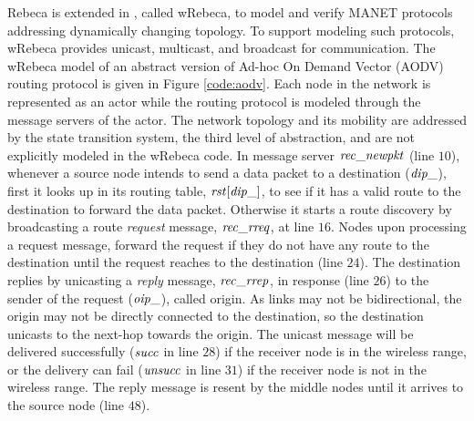 Rebeca is extended in \cite{FOAC}, called wRebeca, to model and verify %
MANET protocols addressing dynamically changing topology. To support modeling such protocols, wRebeca provides unicast, multicast, and broadcast for communication. The wRebeca model of an abstract version of Ad-hoc On Demand Vector (AODV) routing protocol \cite{AODV} is given in Figure \ref{code:aodv}. Each node in the network is represented as an actor while the routing protocol
is modeled through the message servers of the actor. The network topology and its mobility are addressed by the state transition system, the third level of abstraction, and are not explicitly modeled in the wRebeca code.  
%
In message server ${\it rec\_newpkt}$ (line $10$),
whenever a source node intends to send a data packet to a destination (${\it dip\_}$), %
first it looks up in its routing table, ${\it rst}[{\it dip\_}]$, to see if it has a valid route to the destination to forward the data packet. Otherwise it starts a route discovery by broadcasting a route \emph{request} message, ${\it rec\_rreq}$, at line $16$. 
%
Nodes upon processing a request message, forward the request if they do not have any route to the destination until the request reaches to the destination (line $24$). The destination replies by unicasting a \emph{reply} message, ${\it rec\_rrep}$, in response (line $26$) to the sender of the request (${\it oip\_}$), called origin. As links may not be bidirectional, the origin may not be directly connected to the destination, so the destination unicasts to the next-hop towards the origin. The unicast message will be delivered
successfully ($\it succ$ in line $28$) if the receiver node is in the wireless range, or the
delivery can fail ($\it unsucc$ in line $31$) if the receiver node is not in the wireless range. The reply message is resent by the middle nodes until it arrives to the source node (line $48$).

\begin{figure*}
	\begin{center}
		
	\end{center}
	\caption{The AODV protocol specified by wRebeca \label{code:aodv}\cite{FOAC}}
\end{figure*} 

